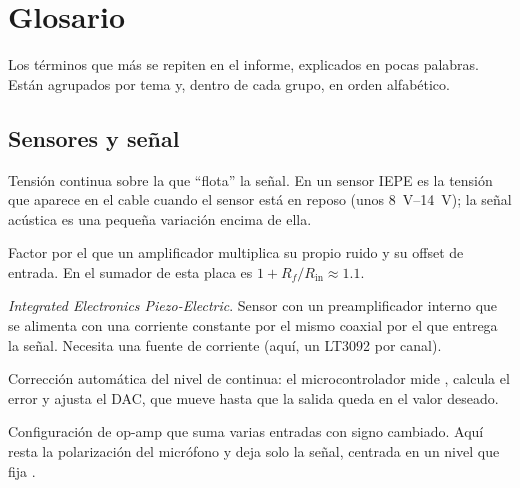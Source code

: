\chapter{Glosario}\label{app:glosario}

Los términos que más se repiten en el informe, explicados en pocas palabras. Están agrupados por tema y, dentro de
cada grupo, en orden alfabético.

\section*{Sensores y señal}
\begin{description}[style=sameline,leftmargin=1.5em,labelindent=0pt]
  \item[DC bias (polarización)] Tensión continua sobre la que ``flota'' la señal. En un sensor IEPE es la tensión que
  aparece en el cable cuando el sensor está en reposo (unos \SIrange{8}{14}{\volt}); la señal acústica es una pequeña
  variación encima de ella.
  \item[Ganancia de ruido] Factor por el que un amplificador multiplica su propio ruido y su offset de entrada. En el
  sumador de esta placa es $1 + R_f/R_\text{in} \approx \num{1.1}$.
  \item[IEPE] \emph{Integrated Electronics Piezo-Electric}. Sensor con un preamplificador interno que se alimenta con
  una corriente constante por el mismo coaxial por el que entrega la señal. Necesita una fuente de corriente (aquí,
  un LT3092 por canal).
  \item[Lazo de DC] Corrección automática del nivel de continua: el microcontrolador mide , calcula el
  error y ajusta el DAC, que mueve  hasta que la salida queda en el valor deseado.
  \item[Sumador inversor] Configuración de op-amp que suma varias entradas con signo cambiado. Aquí resta la
  polarización del micrófono y deja solo la señal, centrada en un nivel que fija .
\end{description}

